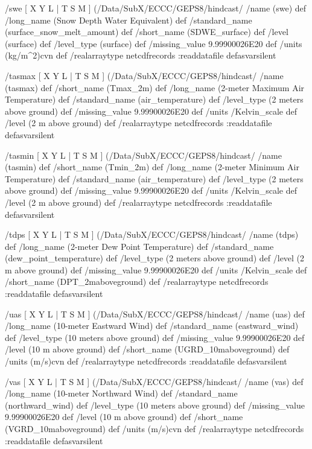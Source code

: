 \begin{ingrid}
 /swe{
[ X Y L | T S M ] (/Data/SubX/ECCC/GEPS8/hindcast/%
/name (swe) def
 /long_name (Snow Depth Water Equivalent) def
 /standard_name (surface_snow_melt_amount) def
 /short_name (SDWE_surface) def
 /level (surface) def
 /level_type (surface) def
 /missing_value 9.99900026E20 def
 /units (kg/m^2)cvn def
 /realarraytype netcdfrecords :readdatafile
}defasvarsilent

 /tasmax{
[ X Y L | T S M ] (/Data/SubX/ECCC/GEPS8/hindcast/%
/name (tasmax) def
 /short_name (Tmax_2m) def
 /long_name (2-meter Maximum Air Temperature) def
 /standard_name (air_temperature) def
 /level_type (2 meters above ground) def
 /missing_value 9.99900026E20 def
 /units /Kelvin_scale def
 /level (2 m above ground) def
 /realarraytype netcdfrecords :readdatafile
}defasvarsilent

 /tasmin{
[ X Y L | T S M ] (/Data/SubX/ECCC/GEPS8/hindcast/%
/name (tasmin) def
 /short_name (Tmin_2m) def
 /long_name (2-meter Minimum Air Temperature) def
 /standard_name (air_temperature) def
 /level_type (2 meters above ground) def
 /missing_value 9.99900026E20 def
 /units /Kelvin_scale def
 /level (2 m above ground) def
 /realarraytype netcdfrecords :readdatafile
}defasvarsilent

 /tdps{
[ X Y L | T S M ] (/Data/SubX/ECCC/GEPS8/hindcast/%
/name (tdps) def
 /long_name (2-meter Dew Point Temperature) def
 /standard_name (dew_point_temperature) def
 /level_type (2 meters above ground) def
 /level (2 m above ground) def
 /missing_value 9.99900026E20 def
 /units /Kelvin_scale def
 /short_name (DPT_2maboveground) def
 /realarraytype netcdfrecords :readdatafile
}defasvarsilent

 /uas{
[ X Y L | T S M ] (/Data/SubX/ECCC/GEPS8/hindcast/%
/name (uas) def
 /long_name (10-meter Eastward Wind) def
 /standard_name (eastward_wind) def
 /level_type (10 meters above ground) def
 /missing_value 9.99900026E20 def
 /level (10 m above ground) def
 /short_name (UGRD_10maboveground) def
 /units (m/s)cvn def
 /realarraytype netcdfrecords :readdatafile
}defasvarsilent

 /vas{
[ X Y L | T S M ] (/Data/SubX/ECCC/GEPS8/hindcast/%
/name (vas) def
 /long_name (10-meter Northward Wind) def
 /standard_name (northward_wind) def
 /level_type (10 meters above ground) def
 /missing_value 9.99900026E20 def
 /level (10 m above ground) def
 /short_name (VGRD_10maboveground) def
 /units (m/s)cvn def
 /realarraytype netcdfrecords :readdatafile
}defasvarsilent


\end{ingrid}
